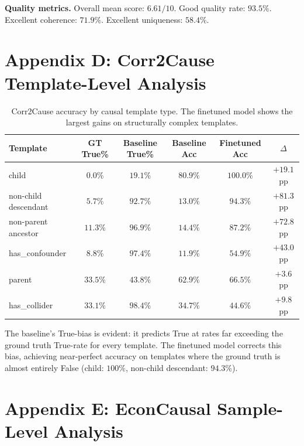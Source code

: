 \documentclass{article}
\begin{document}
\textbf{Quality metrics.} Overall mean score: $6.61/10$. Good quality rate: $93.5\%$. Excellent coherence: $71.9\%$. Excellent uniqueness: $58.4\%$.

\section{Appendix D: Corr2Cause Template-Level Analysis}

\begin{table}[t]
\caption{Corr2Cause accuracy by causal template type. The finetuned model shows the largest gains on structurally complex templates.}
\label{tab:corr2cause_templates}
\begin{center}
\begin{tabular}{lccccc}
\toprule
Template & GT True\% & Baseline True\% & Baseline Acc & Finetuned Acc & $\Delta$ \\
\midrule
child & $0.0\%$ & $19.1\%$ & $80.9\%$ & $100.0\%$ & $+19.1$pp \\
non-child descendant & $5.7\%$ & $92.7\%$ & $13.0\%$ & $94.3\%$ & $+81.3$pp \\
non-parent ancestor & $11.3\%$ & $96.9\%$ & $14.4\%$ & $87.2\%$ & $+72.8$pp \\
has\_confounder & $8.8\%$ & $97.4\%$ & $11.9\%$ & $54.9\%$ & $+43.0$pp \\
parent & $33.5\%$ & $43.8\%$ & $62.9\%$ & $66.5\%$ & $+3.6$pp \\
has\_collider & $33.1\%$ & $98.4\%$ & $34.7\%$ & $44.6\%$ & $+9.8$pp \\
\bottomrule
\end{tabular}
\end{center}
\end{table}

The baseline's True-bias is evident: it predicts True at rates far exceeding the ground truth True-rate for every template. The finetuned model corrects this bias, achieving near-perfect accuracy on templates where the ground truth is almost entirely False (child: $100\%$, non-child descendant: $94.3\%$).

\section{Appendix E: EconCausal Sample-Level Analysis}
\end{document}
